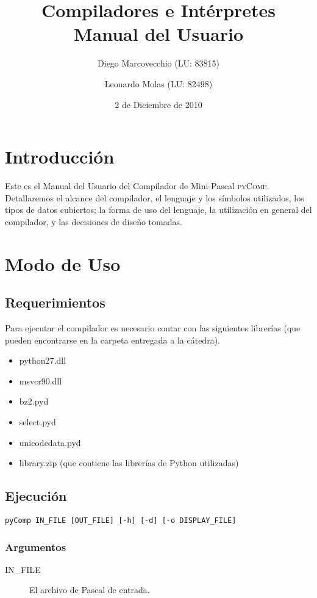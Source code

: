\documentclass[a4paper,oneside]{report}
\title{Compiladores e Intérpretes\\Manual del Usuario}
\author{Diego Marcovecchio (LU: 83815)\and Leonardo Molas (LU: 82498)}
\date{2 de Diciembre de 2010}
\begin{document}
	
\maketitle
		
\tableofcontents

\chapter*{Introducción}

Este es el Manual del Usuario del Compilador de Mini-Pascal \textsc{pyComp}. Detallaremos el alcance del compilador, el lenguaje y los símbolos utilizados, los tipos de datos cubiertos; la forma de uso del lenguaje, la utilización en general del compilador, y las decisiones de diseño tomadas.

\chapter{Modo de Uso}

\section{Requerimientos}
Para ejecutar el compilador es necesario contar con las siguientes librerías (que pueden encontrarse en la carpeta entregada a la cátedra).

\begin{itemize}\ttfamily
	\item python27.dll
	\item msvcr90.dll
	\item bz2.pyd
	\item select.pyd
	\item unicodedata.pyd
	\item library.zip \rmfamily (que contiene las librerías de Python utilizadas)
\end{itemize}

\section{Ejecución}

\verb|pyComp IN_FILE [OUT_FILE] [-h] [-d] [-o DISPLAY_FILE]|

\subsection*{Argumentos}

\begin{description}
	\item[{\ttfamily IN\_FILE}] El archivo de Pascal de entrada.
\end{description}
\end{document}
